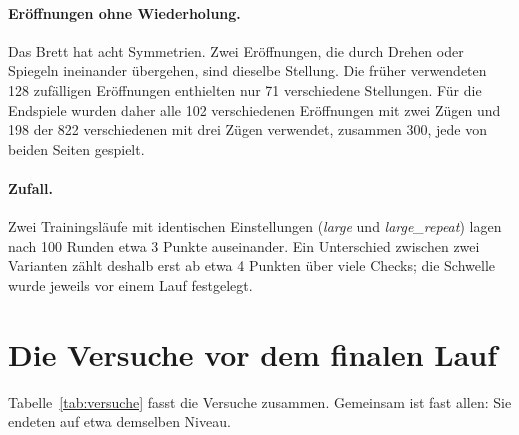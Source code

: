 \documentclass[11pt,a4paper]{article}
\begin{document}
\paragraph{Eröffnungen ohne Wiederholung.} Das Brett hat acht Symmetrien. Zwei Eröffnungen, die durch
Drehen oder Spiegeln ineinander übergehen, sind dieselbe Stellung. Die früher verwendeten 128 zufälligen
Eröffnungen enthielten nur 71 verschiedene Stellungen. Für die Endspiele wurden daher alle 102
verschiedenen Eröffnungen mit zwei Zügen und 198 der 822 verschiedenen mit drei Zügen verwendet, zusammen
300, jede von beiden Seiten gespielt.

\paragraph{Zufall.} Zwei Trainingsläufe mit identischen Einstellungen (\emph{large} und \emph{large\_repeat})
lagen nach 100 Runden etwa 3 Punkte auseinander. Ein Unterschied zwischen zwei Varianten zählt deshalb
erst ab etwa 4 Punkten über viele Checks; die Schwelle wurde jeweils vor einem Lauf festgelegt.

\section{Die Versuche vor dem finalen Lauf}

Tabelle~\ref{tab:versuche} fasst die Versuche zusammen. Gemeinsam ist fast allen: Sie endeten auf etwa
demselben Niveau.
\end{document}
